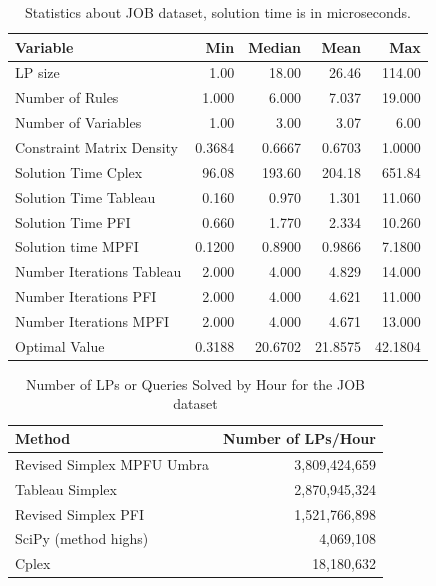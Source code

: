 \begin{table}[!htb]
    \centering
    \caption{Statistics about JOB dataset, solution time is in microseconds.}
    \begin{tabular}{lrrrr}
        \toprule
        Variable                  & Min    & Median  & Mean    & Max     \\
        \midrule
        LP size                   & 1.00   & 18.00   & 26.46   & 114.00  \\
        Number of Rules           & 1.000  & 6.000   & 7.037   & 19.000  \\
        Number of Variables       & 1.00   & 3.00    & 3.07    & 6.00    \\
        Constraint Matrix Density & 0.3684 & 0.6667  & 0.6703  & 1.0000  \\
        Solution Time Cplex       & 96.08  & 193.60  & 204.18  & 651.84  \\
        Solution Time Tableau     & 0.160  & 0.970   & 1.301   & 11.060  \\
        Solution Time PFI         & 0.660  & 1.770   & 2.334   & 10.260  \\
        Solution time MPFI        & 0.1200 & 0.8900  & 0.9866  & 7.1800  \\
        Number Iterations Tableau & 2.000  & 4.000   & 4.829   & 14.000  \\
        Number Iterations PFI     & 2.000  & 4.000   & 4.621   & 11.000  \\
        Number Iterations MPFI    & 2.000  & 4.000   & 4.671   & 13.000  \\
        Optimal Value             & 0.3188 & 20.6702 & 21.8575 & 42.1804 \\
        \bottomrule
    \end{tabular}
    \label{table_job_stats}
\end{table}

\begin{table}[!htb]
    \centering
    \caption{Number of LPs or Queries Solved by Hour for the JOB dataset}
    \begin{tabular}{l|r}
        \toprule
        Method                     & Number of LPs/Hour \\
        \midrule
        Revised Simplex MPFU Umbra & 3,809,424,659          \\
        Tableau Simplex            & 2,870,945,324         \\
        Revised Simplex PFI        & 1,521,766,898         \\
        SciPy (method highs)       & 4,069,108             \\
        Cplex                      & 18,180,632            \\
        \bottomrule
    \end{tabular}
    \label{table_lps_hr_job}
\end{table}



